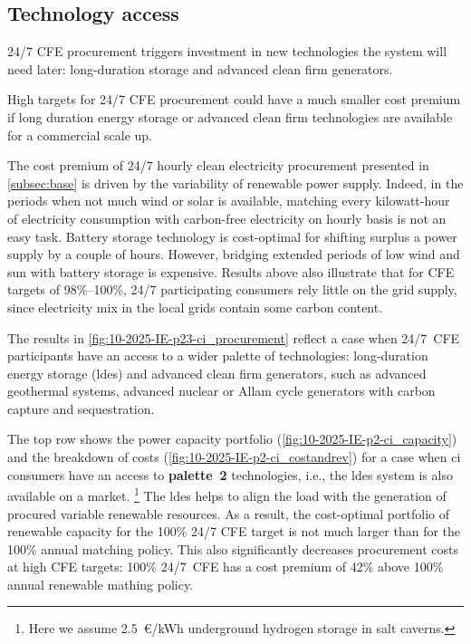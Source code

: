 \subsection{Technology access}
\label{subsec:palette}

\vspace{10pt}
\begin{res}
    24/7 CFE procurement triggers investment in new technologies the system will need later: long-duration storage and advanced clean firm generators.
\end{res}

\vspace*{5pt}
\begin{res}
    High targets for 24/7 CFE procurement could have a much smaller cost premium if long duration energy storage or advanced clean firm technologies are available for a commercial scale up.
\end{res}

The cost premium of 24/7 hourly clean electricity procurement presented in \cref{subsec:base} is driven by the variability of renewable power supply.
Indeed, in the periods when not much wind or solar is available, matching every kilowatt-hour of electricity consumption with carbon-free electricity on hourly basis is not an easy task.
Battery storage technology is cost-optimal for shifting surplus a power supply by a couple of hours. 
However, bridging extended periods of low wind and sun with battery storage is expensive.
Results above also illustrate that for CFE targets of 98\%--100\%, 24/7 participating consumers rely little on the grid supply, since electricity mix in the local grids contain some carbon content.

The results in \cref{fig:10-2025-IE-p23-ci_procurement} reflect a case when 24/7~CFE participants have an access to a wider palette of technologies: 
long-duration energy storage (\gls{ldes}) and advanced clean firm generators, such as advanced geothermal systems, advanced nuclear or Allam cycle generators with carbon capture and sequestration.

The top row shows the power capacity portfolio (\cref{fig:10-2025-IE-p2-ci_capacity}) and the breakdown of costs (\cref{fig:10-2025-IE-p2-ci_costandrev}) for a case when \gls{ci} consumers have an access to \textbf{palette~2} technologies, i.e., the \gls{ldes} system is also available on a market.%
\footnote{Here we assume 2.5~\euro/kWh underground hydrogen storage in salt caverns.}
The \gls{ldes} helps to align the load with the generation of procured variable renewable resources. 
As a result, the cost-optimal portfolio of renewable capacity for the 100\% 24/7 CFE target is not much larger than for the 100\% annual matching policy. 
This also significantly decreases procurement costs at high CFE targets: 100\% 24/7~CFE has a cost premium of 42\% above 100\% annual renewable mathing policy.

